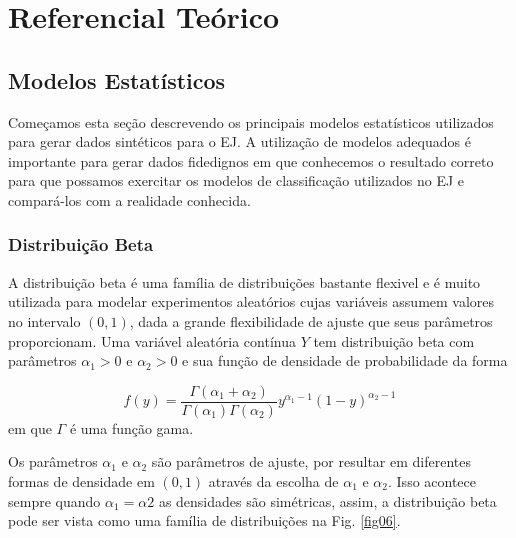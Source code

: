 \chapter{Referencial Teórico}

\section{Modelos Estatísticos}

Começamos esta seção descrevendo os principais modelos estatísticos utilizados para gerar dados sintéticos para o EJ. A utilização de modelos adequados é importante para gerar dados fidedignos em que conhecemos o resultado correto para que possamos exercitar os modelos de classificação utilizados no EJ e compará-los com a realidade conhecida.

\subsection{Distribuição Beta}

A distribuição beta é uma família de distribuições bastante flexivel e é muito utilizada para modelar experimentos aleatórios cujas variáveis assumem valores no intervalo $(0,1)$, dada a grande flexibilidade de ajuste que seus parâmetros proporcionam. Uma variável aleatória contínua $Y$ tem distribuição beta com parâmetros $\alpha_1 > 0$ e $\alpha_2 > 0$ e sua função de densidade de probabilidade da forma

\begin{equation}
f(y)=\frac {\Gamma(\alpha_1+\alpha_2)}{\Gamma(\alpha_1)\Gamma(\alpha_2)} y^{\alpha_1-1}(1-y)^{\alpha_2-1}
\end{equation}
%
em que $\Gamma$ é uma função gama.

Os parâmetros $\alpha_1$ e $\alpha_2$ são parâmetros de ajuste, por resultar em diferentes formas de densidade em $(0,1)$ através da escolha de $\alpha_1$ e $\alpha_2$. Isso acontece sempre quando $\alpha_1 = \alpha2$ as densidades são simétricas, assim, a distribuição beta pode ser vista como uma família de distribuições na Fig. \ref{fig06}.


